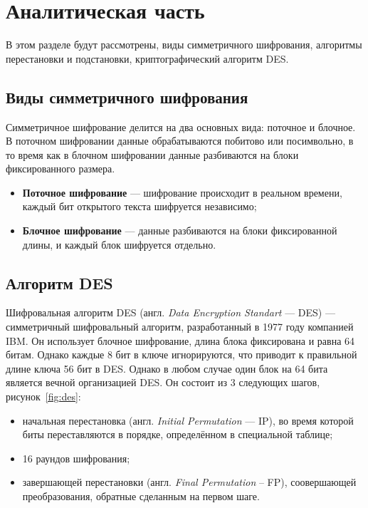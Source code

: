 \chapter{Аналитическая часть}

В этом разделе будут рассмотрены, виды симметричного шифрования, алгоритмы перестановки и подстановки, криптографический алгоритм DES.

\section{Виды симметричного шифрования}

Симметричное шифрование делится на два основных вида: поточное и блочное. В поточном шифровании данные обрабатываются побитово или посимвольно, в то время как в блочном шифровании данные разбиваются на блоки фиксированного размера.

\begin{itemize}[label=---]
    \item \textbf{Поточное шифрование} --- шифрование происходит в реальном времени, каждый бит открытого текста шифруется независимо;
    \item  \textbf{Блочное шифрование} --- данные разбиваются на блоки фиксированной длины, и каждый блок шифруется отдельно.
\end{itemize}


\section{Алгоритм DES}

Шифровальная алгоритм DES (англ. \textit{Data Encryption Standart} --- DES) --- симметричный шифровальный алгоритм, разработанный в 1977 году компанией IBM. Он использует блочное шифрование, длина блока фиксирована и равна 64 битам. 
Однако каждые 8 бит в ключе игнорируются, что приводит к правильной длине ключа 56 бит в DES. 
Однако в любом случае один блок на 64 бита является вечной организацией DES.
Он состоит из 3 следующих шагов, рисунок~\ref{fig:des}: 
\begin{itemize}
	\item начальная перестановка (англ. \textit{Initial Permutation} --- IP), во время которой биты переставляются в порядке, определённом в специальной таблице;
	\item 16 раундов шифрования;
	\item завершающей перестановки (англ. \textit{Final Permutation} -- FP), соовершающей преобразования, обратные сделанным на первом шаге.
\end{itemize}

